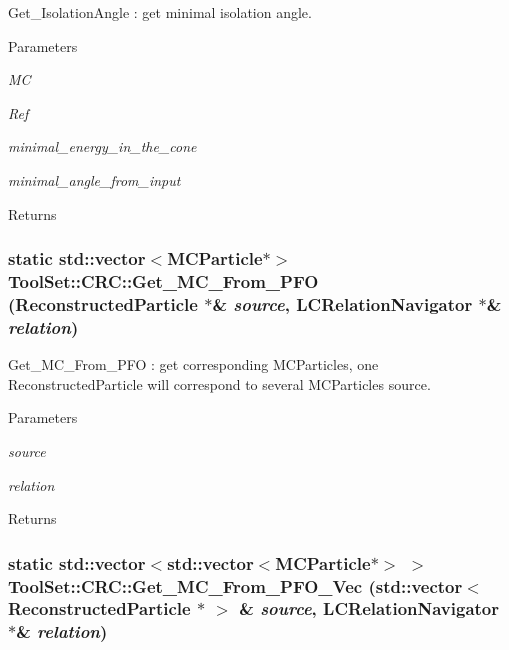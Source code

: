 Get\_\-IsolationAngle : get minimal isolation angle. 
\begin{DoxyParams}{Parameters}
\item[{\em MC}]\item[{\em Ref}]\item[{\em minimal\_\-energy\_\-in\_\-the\_\-cone}]\item[{\em minimal\_\-angle\_\-from\_\-input}]\end{DoxyParams}
\begin{DoxyReturn}{Returns}

\end{DoxyReturn}
\hypertarget{classToolSet_1_1CRC_ab931816f16f8767329774a8309709d3c}{
\subsubsection[{Get\_\-MC\_\-From\_\-PFO}]{\setlength{\rightskip}{0pt plus 5cm}static std::vector$<$MCParticle$\ast$$>$ ToolSet::CRC::Get\_\-MC\_\-From\_\-PFO (ReconstructedParticle $\ast$\& {\em source}, \/  LCRelationNavigator $\ast$\& {\em relation})}}
\label{classToolSet_1_1CRC_ab931816f16f8767329774a8309709d3c}


Get\_\-MC\_\-From\_\-PFO : get corresponding MCParticles, one ReconstructedParticle will correspond to several MCParticles source. 
\begin{DoxyParams}{Parameters}
\item[{\em source}]\item[{\em relation}]\end{DoxyParams}
\begin{DoxyReturn}{Returns}

\end{DoxyReturn}
\hypertarget{classToolSet_1_1CRC_a09c33fa93c99c29e9157bf915625108a}{
\subsubsection[{Get\_\-MC\_\-From\_\-PFO\_\-Vec}]{\setlength{\rightskip}{0pt plus 5cm}static std::vector$<$std::vector$<$MCParticle$\ast$$>$ $>$ ToolSet::CRC::Get\_\-MC\_\-From\_\-PFO\_\-Vec (std::vector$<$ ReconstructedParticle $\ast$ $>$ \& {\em source}, \/  LCRelationNavigator $\ast$\& {\em relation})}}
\label{classToolSet_1_1CRC_a09c33fa93c99c29e9157bf915625108a}


